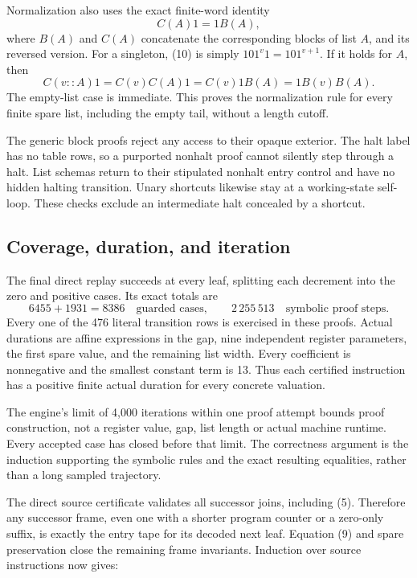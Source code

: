 \documentclass[11pt]{article}
\theoremstyle{definition}\newtheorem{definition}[theorem]{Definition}
\begin{document}
Normalization also uses the exact finite-word identity
\[
 C(A)1=1B(A),
 \tag{10}
\]
where $B(A)$ and $C(A)$ concatenate the corresponding blocks of list $A$,
and its reversed version.  For a singleton, (10) is simply
$101^v1=101^{v+1}$.  If it holds for $A$, then
\[
 C(v::A)1=C(v)C(A)1=C(v)1B(A)=1B(v)B(A).
\]
The empty-list case is immediate.  This proves the normalization rule for
every finite spare list, including the empty tail, without a length cutoff.

The generic block proofs reject any access to their opaque exterior.
The halt label has no table rows, so a purported nonhalt proof cannot
silently step through a halt.  List schemas return to their stipulated
nonhalt entry control and have no hidden halting transition.  Unary
shortcuts likewise stay at a working-state self-loop.  These checks
exclude an intermediate halt concealed by a shortcut.

\subsection{Coverage, duration, and iteration}

The final direct replay succeeds at every leaf, splitting each decrement
into the zero and positive cases.  Its exact totals are
\[
 6455+1931=8386\quad\text{guarded cases},
 \qquad 2\,255\,513\quad\text{symbolic proof steps}.
\]
Every one of the 476 literal transition rows is exercised in these proofs.
Actual durations are affine expressions in the gap, nine independent
register parameters, the first spare value, and the remaining list width.
Every coefficient is nonnegative and the smallest constant term is 13.
Thus each certified instruction has a positive finite actual duration
for every concrete valuation.

The engine's limit of 4,000 iterations within one proof attempt bounds
proof construction, not a register value, gap, list length or actual
machine runtime.  Every accepted case has closed before that limit.
The correctness argument is the induction supporting the symbolic rules
and the exact resulting equalities, rather than a long sampled trajectory.

The direct source certificate validates all successor joins, including
(5).  Therefore any successor frame, even one with a shorter program
counter or a zero-only suffix, is exactly the entry tape for its decoded
next leaf.  Equation (9) and spare preservation close the remaining frame
invariants.  Induction over source instructions now gives:
\end{document}
